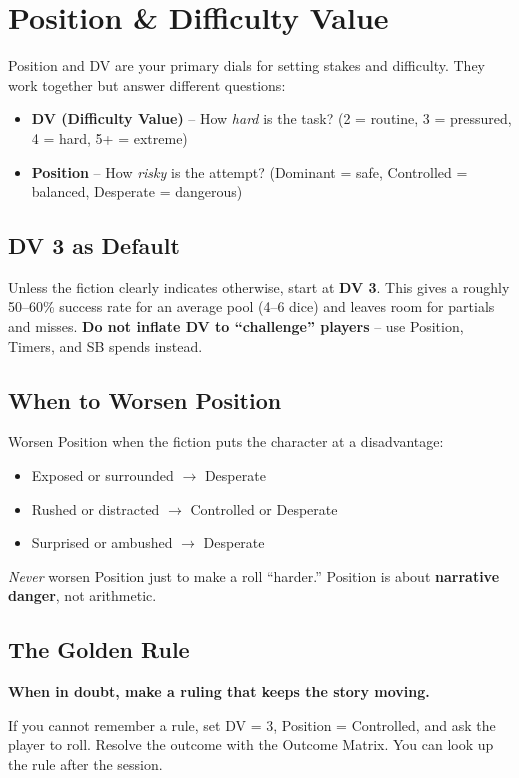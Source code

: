 \section{Position \& Difficulty Value}
\label{sec:position-dv}

Position and DV are your primary dials for setting stakes and difficulty. They work together but answer different questions:

\begin{itemize}
\item \textbf{DV (Difficulty Value)} -- How \emph{hard} is the task? (2 = routine, 3 = pressured, 4 = hard, 5+ = extreme)
\item \textbf{Position} -- How \emph{risky} is the attempt? (Dominant = safe, Controlled = balanced, Desperate = dangerous)
\end{itemize}

\subsection{DV 3 as Default}
Unless the fiction clearly indicates otherwise, start at \textbf{DV 3}. This gives a roughly 50--60\% success rate for an average pool (4--6 dice) and leaves room for partials and misses. \textbf{Do not inflate DV to ``challenge'' players} -- use Position, Timers, and SB spends instead.

\subsection{When to Worsen Position}
Worsen Position when the fiction puts the character at a disadvantage:
\begin{itemize}
\item Exposed or surrounded $\rightarrow$ Desperate
\item Rushed or distracted $\rightarrow$ Controlled or Desperate
\item Surprised or ambushed $\rightarrow$ Desperate
\end{itemize}
\emph{Never} worsen Position just to make a roll ``harder.'' Position is about \textbf{narrative danger}, not arithmetic.

\subsection{The Golden Rule}
\begin{tcolorbox}[colback=yellow!5,colframe=yellow!75!black,title={Golden Rule}, breakable]
\textbf{When in doubt, make a ruling that keeps the story moving.}

If you cannot remember a rule, set DV = 3, Position = Controlled, and ask the player to roll. Resolve the outcome with the Outcome Matrix. You can look up the rule after the session.
\end{tcolorbox}

